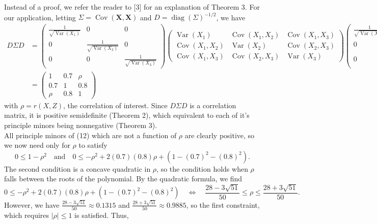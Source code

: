 \documentclass[10pt]{article}
\newcommand{\bs}[1]{\boldsymbol{#1}}
\newcommand{\1}[1]{\mathbbm{1}_{#1}}
\DeclareMathOperator{\Var}{Var}
\DeclareMathOperator{\Cov}{Cov}
\DeclareMathOperator{\diag}{diag}
\begin{document}
    \noindent Instead of a proof, we refer the reader to [3] for an explanation of Theorem 3. For our application, letting $\Sigma=\Cov(\bs{X},\bs{X})$ and $D=\diag(\Sigma)^{-1/2}$, we have
    \begin{align*}
        D\Sigma D&=\begin{pmatrix}
            \frac{1}{\sqrt{\Var(X_1)}} & 0 & 0\\
            0 & \frac{1}{\sqrt{\Var(X_2)}} & 0\\
            0 & 0 & \frac{1}{\sqrt{\Var(X_3)}}
        \end{pmatrix}
        \begin{pmatrix}
            \Var(X_1) & \Cov(X_1,X_2) & \Cov(X_1,X_3)\\
            \Cov(X_1,X_2) & \Var(X_2) & \Cov(X_2,X_3)\\
            \Cov(X_1,X_3) & \Cov(X_2,X_3) & \Var(X_3)
        \end{pmatrix}
        \begin{pmatrix}
            \frac{1}{\sqrt{\Var(X_1)}} & 0 & 0\\
            0 & \frac{1}{\sqrt{\Var(X_2)}} & 0\\
            0 & 0 & \frac{1}{\sqrt{\Var(X_3)}}
        \end{pmatrix}\\
        &=\begin{pmatrix}
            1 & 0.7 & \rho \\
            0.7 & 1 & 0.8 \\
            \rho & 0.8 & 1
        \end{pmatrix}\tag{12}
    \end{align*}
    with $\rho=r(X,Z)$, the correlation of interest. Since $D\Sigma D$ is a correlation matrix, it is positive semidefinite (Theorem 2), which equivalent to each of it's principle minors being nonnegative (Theorem 3).\\[5pt] All principle minors of (12) which are not a function of $\rho$ are clearly positive, so
    we now need only for $\rho$ to satisfy
    \[0\leq 1-\rho^2\quad \text{and}\quad 0\leq -\rho^2+2(0.7)(0.8)\rho+(1-(0.7)^2-(0.8)^2).\]
    The second condition is a concave quadratic in $\rho$, so the condition holds when $\rho$ falls between the roots of the polynomial. By the quadratic formula, we find
    \[0\leq -\rho^2+2(0.7)(0.8)\rho+(1-(0.7)^2-(0.8)^2)\quad\Leftrightarrow\quad\frac{28-3\sqrt{51}}{50}\leq\rho\leq\frac{28+3\sqrt{51}}{50}.\]
    However, we have $\frac{28-3\sqrt{51}}{50}\approx 0.1315$ and $\frac{28+3\sqrt{51}}{50}\approx 0.9885$, so the first constraint, which requires $|\rho|\leq 1$ is satisfied. Thus,
\end{document}
